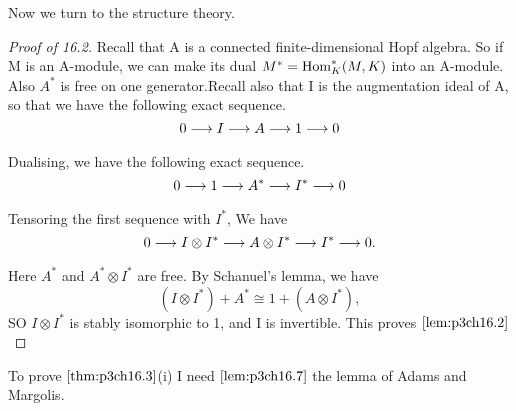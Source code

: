 \documentclass[../main]{subfiles}
\begin{document}
Now we turn to the structure theory.

\begin{proof}[Proof of 16.2] Recall that A is a connected finite-dimensional
Hopf algebra. So if M is an A-module, we can make its dual $M^{\ast}=\mathrm{Hom}_{K}^{\ast}(M, K)$ into an A-module. Also $A^{\ast}$ is free on one generator.Recall also that I is the augmentation ideal of A, so that we have the
following exact sequence. \begin{equation*} 
    0 \lar{} I \lar{} A \lar{} 1 \lar{} 0
\end{equation*}
Dualising, we have the following exact sequence. 
\begin{equation*}
    0 \lar{} 1 \lar{} A^{\ast} \lar{} I^{\ast} \lar{} 0
\end{equation*}
Tensoring the first sequence with $I^{\ast}$, We have \begin{equation*}
    0 \lar{} I\otimes I^{\ast} \lar{} A\otimes I^{\ast} \lar{} I^{\ast} \lar{} 0.
\end{equation*}
Here $A^{\ast}$ and $A^{\ast}\otimes I^{\ast}$ are free. By Schanuel's lemma, we have \begin{equation*}
    \left(I\otimes I^{\ast}\right)+ A^{\ast}\cong 1+(A\otimes I^{\ast}), 
\end{equation*}
SO $I\otimes I^{\ast}$ is stably isomorphic to 1, and I is invertible. This proves $\ref{lem:p3ch16.2}$
\end{proof}
To prove $\ref{thm:p3ch16.3}$(i) I need $\ref{lem:p3ch16.7}$ the lemma of Adams and Margolis.
\end{document}
